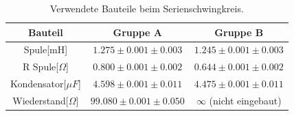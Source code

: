 \documentclass[12pt,a4paper]{article}
\begin{document}
\begin{table}
\centering
\begin{tabular}{|c|c|c|}
\hline
Bauteil & Gruppe A & Gruppe B\\
\hline
Spule[mH] & $1.275\pm 0.001\pm 0.003$ & $1.245\pm 0.001\pm 0.003$\\
\hline
R Spule[$\Omega$] & $0.800\pm 0.001\pm 0.002$ & $0.644\pm 0.001\pm 0.002$\\
\hline
Kondensator[$\mu F$] & $4.598\pm 0.001\pm 0.011$ & $4.475\pm 0.001\pm 0.011$\\
\hline
Wiederstand[$\Omega$] & $99.080\pm 0.001\pm 0.050$ & $\infty$ (nicht eingebaut)\\
\hline
\end{tabular}
\label{tab:parallel_Bauteile}
\caption{Verwendete Bauteile beim Serienschwingkreis.}
\end{table}
\end{document}
